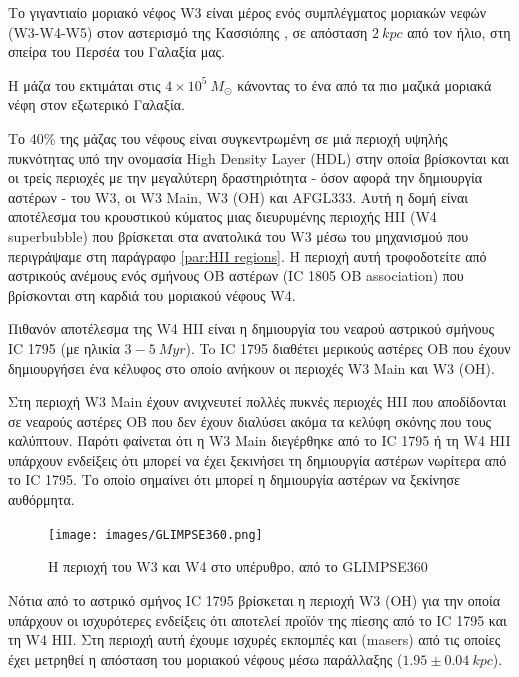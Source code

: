 \documentclass[a4paper,12pt]{memoir}
\newcommand{\e}[1]{\times 10^{#1}}
\begin{document}
Το γιγαντιαίο μοριακό νέφος W3 είναι μέρος ενός συμπλέγματος μοριακών νεφών (W3-W4-W5) στον αστερισμό της Κασσιόπης , σε απόσταση $2 \ kpc$ από τον ήλιο, στη σπείρα του Περσέα του Γαλαξία μας. 

Η μάζα του εκτιμάται στις $4\e{5} \ M_{\odot}$ κάνοντας το ένα από τα πιο μαζικά μοριακά νέφη στον εξωτερικό Γαλαξία.

Το 40\% της μάζας του νέφους είναι συγκεντρωμένη σε μιά περιοχή υψηλής πυκνότητας υπό την ονομασία High Density Layer (HDL) στην οποία βρίσκονται και οι τρείς περιοχές με την μεγαλύτερη δραστηριότητα - όσον αφορά την δημιουργία αστέρων - του 
W3, οι W3 Main, W3 (OH) και AFGL333. Αυτή η δομή είναι αποτέλεσμα του κρουστικού κύματος μιας διευρυμένης περιοχής HII (W4 superbubble) που βρίσκεται στα ανατολικά του W3 μέσω του μηχανισμού που περιγράψαμε στη παράγραφο \ref{par:HII regions}. Η περιοχή αυτή τροφοδοτείτε από αστρικούς ανέμους ενός σμήνους OB αστέρων (IC 1805 OB association) που βρίσκονται στη καρδιά του μοριακού νέφους W4.

Πιθανόν αποτέλεσμα της W4 HII είναι η δημιουργία του νεαρού αστρικού σμήνους IC 1795 (με ηλικία $3-5 \ Myr$). To IC 1795 διαθέτει μερικούς αστέρες OB που έχουν δημιουργήσει ένα κέλυφος στο οποίο ανήκουν οι περιοχές W3 Main και W3 (OH).

Στη περιοχή W3 Main έχουν ανιχνευτεί πολλές πυκνές περιοχές HII που αποδίδονται σε νεαρούς αστέρες OB που δεν έχουν διαλύσει ακόμα τα κελύφη σκόνης που τους καλύπτουν. Παρότι φαίνεται ότι η W3 Main διεγέρθηκε από το IC 1795 ή τη W4 HII υπάρχουν ενδείξεις ότι μπορεί να έχει ξεκινήσει τη δημιουργία αστέρων νωρίτερα από το IC 1795. Το οποίο σημαίνει ότι μπορεί η δημιουργία αστέρων να ξεκίνησε αυθόρμητα.


\begin{figure}[h]
	\centering
	\texttt{[image: images/GLIMPSE360.png]}
	\caption{Η περιοχή του W3 και W4 στο υπέρυθρο, από το GLIMPSE360}
\end{figure}

Νότια από το αστρικό σμήνος IC 1795 βρίσκεται η περιοχή W3 (OH) για την οποία υπάρχουν οι ισχυρότερες ενδείξεις ότι αποτελεί προϊόν της πίεσης από το IC 1795 και τη  W4 HII. Στη περιοχή αυτή έχουμε ισχυρές εκπομπές  και  (masers) από τις οποίες έχει μετρηθεί η απόσταση του μοριακού νέφους μέσω παράλλαξης ($1.95 \pm 0.04 \ kpc$).
\end{document}
